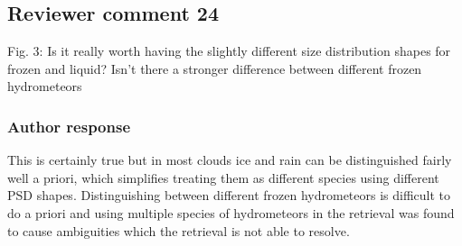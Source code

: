 \documentclass[11pt]{scrartcl}
\begin{document}
%
%
%


\subsection*{Reviewer comment 24}

Fig.  3: Is it really worth having the slightly different size distribution shapes for frozen and liquid? Isn’t there a stronger difference between different frozen hydrometeors

\subsubsection*{Author response}

This is certainly true but in most clouds ice and rain can be distinguished
fairly well a priori, which simplifies treating them as different species using
different PSD shapes. Distinguishing between different frozen hydrometeors is
difficult to do a priori and using multiple species of hydrometeors in the
retrieval was found to cause ambiguities which the retrieval is not able to
resolve.


\end{document}
